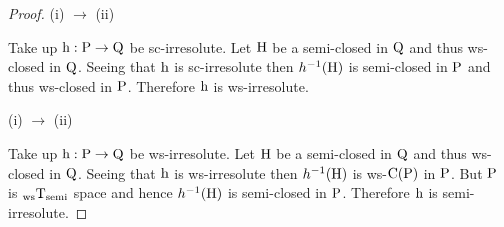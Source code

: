 \begin{proof}
(i) $\to$ (ii)

Take up $\mathrm{h}: \mathrm{P}\to \mathrm{Q}$ be sc-irresolute. Let $\mathrm{H}$ be a semi-closed in $\mathrm{Q}$ and thus ws-closed in $\mathrm{Q}$. Seeing that $\mathrm{h}$ is sc-irresolute then $h^{-1}(\mathrm{H})$ is semi-closed in $\mathrm{P}$ and thus ws-closed in $\mathrm{P}$. Therefore $\mathrm{h}$ is ws-irresolute.

(i) $\to$ (ii)

Take up $\mathrm{h}: \mathrm{P}\to \mathrm{Q}$ be ws-irresolute. Let $\mathrm{H}$ be a semi-closed in $\mathrm{Q}$ and thus ws-closed in $\mathrm{Q}$. Seeing that $\mathrm{h}$ is ws-irresolute then $h^{-1}(\mathrm{H})$ is ws-$\mathrm{C}(\mathrm{P})$ in $\mathrm{P}$. But $\mathrm{P}$ is $_{\mathrm{ws}}\mathrm{T}_{\text{semi}}$ space and hence $h^{-1}(\mathrm{H})$ is semi-closed in $\mathrm{P}$. Therefore $\mathrm{h}$ is semi-irresolute.
\end{proof}
